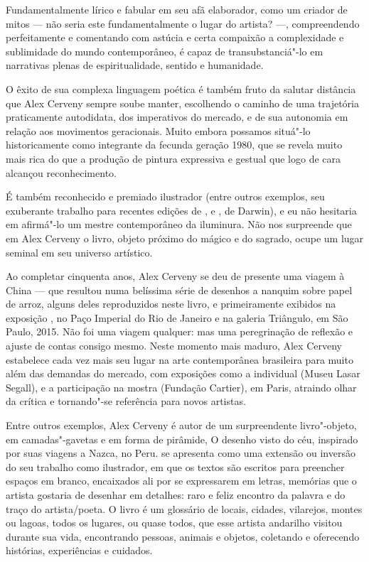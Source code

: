 Fundamentalmente lírico e fabular em seu afã elaborador, como um criador de mitos — não seria este fundamentalmente o lugar do artista? —, compreendendo perfeitamente e comentando com astúcia e certa compaixão a complexidade e sublimidade do mundo contemporâneo, é capaz de transubstanciá"-lo em narrativas plenas de espiritualidade, sentido e humanidade.

O êxito de sua complexa linguagem poética é também fruto da salutar distância que Alex Cerveny sempre soube manter, escolhendo o caminho de uma trajetória praticamente autodidata, dos imperativos do mercado, e de sua autonomia em relação aos movimentos geracionais. Muito embora possamos situá"-lo historicamente como integrante da fecunda geração 1980, que se revela muito mais rica do que a produção de pintura expressiva e gestual que logo de cara alcançou reconhecimento. 

É também reconhecido e premiado ilustrador (entre outros exemplos, seu exuberante trabalho para recentes edições de {}, {} e {}, de Darwin), e eu não hesitaria em afirmá"-lo um mestre contemporâneo da iluminura. Não nos surpreende que em Alex Cerveny o livro, objeto próximo do mágico e do sagrado, ocupe um lugar seminal em seu universo artístico. 

Ao completar cinquenta anos, Alex Cerveny se deu de presente uma viagem à China — que resultou numa belíssima série de desenhos a nanquim sobre papel de arroz, alguns deles reproduzidos neste livro, e primeiramente exibidos na exposição {}, no Paço Imperial do Rio de Janeiro e na galeria Triângulo, em São Paulo, 2015. Não foi uma viagem qualquer: mas uma peregrinação de reflexão e ajuste de contas consigo mesmo. Neste momento mais maduro, Alex Cerveny estabelece cada vez mais seu lugar na arte contemporânea brasileira para muito além das demandas do mercado, com exposições como a individual {} (Museu Lasar Segall), e a participação na mostra {} (Fundação Cartier), em Paris, atraindo olhar da crítica e tornando"-se referência para novos artistas. 

Entre outros exemplos, Alex Cerveny é autor de um surpreendente livro"-objeto, em camadas"-gavetas e em forma de pirâmide, O desenho visto do céu, inspirado por suas viagens a Nazca, no Peru. {} se apresenta como uma extensão ou inversão do seu trabalho como ilustrador, em que os textos são escritos para preencher espaços em branco, encaixados ali por se expressarem em letras, memórias que o artista gostaria de desenhar em detalhes: raro e feliz encontro da palavra e do traço do artista/poeta. O livro é um glossário de locais, cidades, vilarejos, montes ou lagoas, todos os lugares, ou quase todos, que esse artista andarilho visitou durante sua vida, encontrando pessoas, animais e objetos, coletando e oferecendo histórias, experiências e cuidados. 

